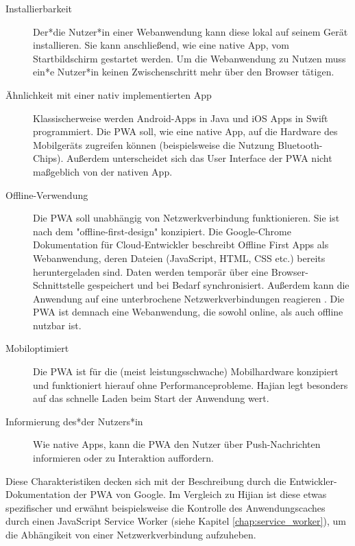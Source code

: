 \begin{description}
  \item [Installierbarkeit]
	  Der*die Nutzer*in einer Webanwendung kann diese lokal auf seinem Gerät installieren. Sie kann anschließend, wie eine native App, vom Startbildschirm gestartet werden. Um die Webanwendung zu Nutzen muss ein*e Nutzer*in keinen Zwischenschritt mehr über den Browser tätigen.
  
  \item [Ähnlichkeit mit einer nativ implementierten App]  
 	 Klassischerweise werden Android-Apps in Java und iOS Apps in Swift programmiert. Die PWA soll, wie eine native App, auf die Hardware des Mobilgeräts zugreifen können (beispielsweise die Nutzung Bluetooth-Chips). Außerdem unterscheidet sich das User Interface der PWA nicht maßgeblich von der nativen App. 
  
  \item [Offline-Verwendung] 
  	Die PWA soll unabhängig von Netzwerkverbindung funktionieren. Sie ist nach dem "offline-first-design" konzipiert. Die Google-Chrome Dokumentation für Cloud-Entwickler beschreibt Offline First Apps als Webanwendung, deren Dateien (JavaScript, HTML, CSS etc.) bereits heruntergeladen sind. Daten werden temporär über eine Browser-Schnittstelle gespeichert und bei Bedarf synchronisiert. Außerdem kann die Anwendung auf eine unterbrochene Netzwerkverbindungen reagieren \cite{GoogleOfflineApps}. Die PWA ist demnach eine Webanwendung, die sowohl online, als auch offline nutzbar ist.

  \item [Mobiloptimiert]  
  	Die PWA ist für die (meist leistungsschwache) Mobilhardware konzipiert und funktioniert hierauf ohne Performanceprobleme. Hajian legt besonders auf das schnelle Laden beim Start der Anwendung wert.
  	
  \item [Informierung des*der Nutzers*in] 
  	Wie native Apps, kann die PWA den Nutzer über Push-Nachrichten informieren oder zu Interaktion auffordern.
\end{description}

\cite[S. 1f.]{Hajian2019}
Diese Charakteristiken decken sich mit der Beschreibung durch die Entwickler-Dokumentation der PWA von Google. Im Vergleich zu Hijian ist diese etwas spezifischer und erwähnt beispielsweise die Kontrolle des Anwendungscaches durch einen JavaScript Service Worker (siehe Kapitel \ref{chap:service_worker}), um die Abhängikeit von einer Netzwerkverbindung aufzuheben.
\cite{GooglePWAOverview}

